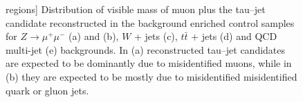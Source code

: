 \begin{figure}
\begin{center}
regions]{\captiontext 
	 Distribution of visible mass of muon plus the tau--jet candidate reconstructed
         in the background enriched control samples for 
         $Z \to \mu^{+} \mu^{-}$ (a) and (b), $W$ + jets (c), $t\bar{t}$ + jets (d) and QCD multi-jet (e) backgrounds.
         In (a) reconstructed tau--jet candidates are expected to be dominantly due to misidentified muons,
         while in (b) they are expected to be mostly due to misidentified misidentified quark or gluon jets.}
\label{fig:VisMassMuTauBgControlRegions}
\end{center}
\end{figure} 

